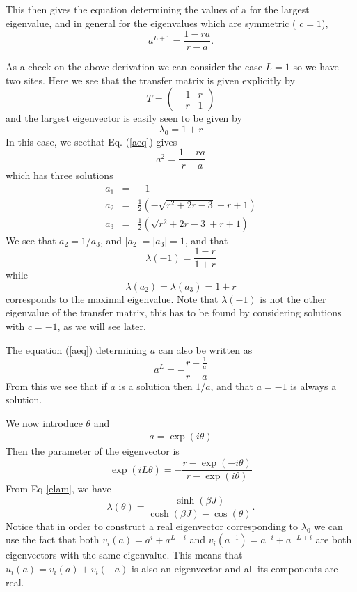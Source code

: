 This then gives the equation determining the values of a for the largest eigenvalue, and in general for the eigenvalues which are symmetric ( $c=1$),
\begin{equation}
a^{L+1} = \frac{1-ra}{r-a}.
\label{aeq}
\end{equation}

As a check on the above derivation we can consider the case $L=1$ so we have two sites. Here we see that the transfer matrix is given explicitly by
\begin{equation}
T =\begin{pmatrix} & 1 & r\\& r &1\end{pmatrix}
\end{equation}
and the largest eigenvector is easily seen to be given by
\begin{equation}
\lambda_0 = 1+r 
\end{equation}
In this case, we seethat Eq. (\ref{aeq}) gives
\begin{equation}
a^{2} = \frac{1-ra}{r-a}
\end{equation}
which has three solutions
\begin{eqnarray}
a_1&=& -1\\
a_2&=& \frac{1}{2} \left(-\sqrt{r^2+2
r-3}+r+1\right) \\
a_3&=& \frac{1}{2} \left(\sqrt{r^2+2
r-3}+r+1\right)\end{eqnarray}
We see that $a_2=1/a_3$, and $|a_2|=|a_3|=1$, and that
\begin{equation}
\lambda(-1)= \frac{1-r}{1+r}
\end{equation}
while 
\begin{equation}
\lambda(a_2)=\lambda(a_3)= 1+r
\end{equation}
corresponds to the maximal eigenvalue. Note that $\lambda(-1)$ is not the other eigenvalue of the transfer matrix, this has to be found by considering solutions with $c=-1$, as we will see later.

The equation (\ref{aeq}) determining $a$ can also be written as
\begin{equation}
a^{L} = - \frac{r-\frac{1}{a}}{r-a}
\end{equation}
From this we see that if $a$ is a solution then $1/a$, and that $a=-1$ is always a solution.


We now introduce $\theta$ and 
\begin{align}
a=\exp(i\theta)
\label{def-theta}
\end{align}
Then the parameter of the eigenvector is
\begin{equation}
\exp(i L \theta) = - \frac{r-\exp(-i\theta)}{r-\exp(i\theta)}
\label{thetamas}
\end{equation}
From Eq \eqref{elam}, we have
\begin{equation}
\lambda(\theta) = \frac{\sinh(\beta J)}{\cosh(\beta J) - \cos(\theta)}.
\end{equation}
Notice that in order to construct a real eigenvector corresponding to $\lambda_0$ we can use the fact that both $v_i(a) = a^i + a^{L-i}$ and $v_i(a^{-1}) = a^{-i} + a^{-L+i}$ are both eigenvectors with the same eigenvalue. This means that $u_i(a) = v_i(a) + v_i(-a)$ is also an eigenvector and all its components are real. 

